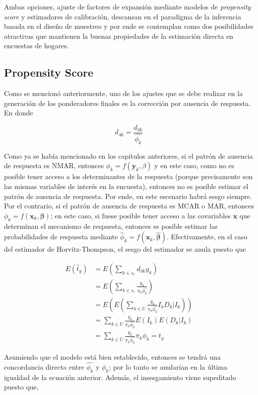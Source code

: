 \documentclass[
  12pt,
]{book}
\begin{document}
Ambas opciones, ajuste de factores de expansión mediante modelos de \emph{propensity score} y estimadores de calibración, descansan en el paradigma de la inferencia basada en el diseño de muestreo y por ende se contemplan como dos posibilidades atractivas que mantienen la buenas propiedades de la estimación directa en encuestas de hogares.

\hypertarget{propensity-score}{%
\subsection{Propensity Score}\label{propensity-score}}

Como se mencionó anteriormente, uno de los ajustes que se debe realizar en la generación de los ponderadores finales es la corrección por ausencia de respuesta. En donde

\[d_{4k} =  \frac{d_{3k}}{\hat{\phi_k}}\]

Como ya se había mencionado en los capítulos anteriores, si el patrón de ausencia de respuesta es NMAR, entonces \(\phi_k = f(\mathbf{y}_k, \beta)\) y en este caso, como no es posible tener acceso a los determinantes de la respuesta (porque precisamente son las mismas variables de interés en la encuesta), entonces no es posible estimar el patrón de ausencia de respuesta. Por ende, en este escenario habrá sesgo siempre. Por el contrario, si el patrón de ausencia de respuesta es MCAR o MAR, entonces \(\phi_k = f(\mathbf{x}_k, \boldsymbol{\beta})\); en este caso, si fuese posible tener acceso a las covariables \(\mathbf{x}\) que determinan el mecanismo de respuesta, entonces es posible estimar las probabilidades de respuesta mediante \(\hat{\phi}_k = f(\mathbf{x}_k, \hat{\boldsymbol{\beta}})\). Efectivamente, en el caso del estimador de Horvitz-Thompson, el sesgo del estimador se anula puesto que

\begin{align*}
E(\hat{t}_y) &= E\left(\sum_{k\in s_r}d_{3k}y_k\right) \\
&= E\left(\sum_{k\in s_r}\frac{y_k}{\pi_k \hat{\phi_k}}\right)\\
&= E\left(E\left(\sum_{k\in U}\frac{y_k}{\pi_k \hat{\phi_k}}I_kD_k|I_k\right)\right)\\
&= \sum_{k\in U}\frac{y_k}{\pi_k \hat{\phi_k}}E\left(I_k\right)E\left(D_k|I_k\right)\\
&= \sum_{k\in U}\frac{y_k}{\pi_k \hat{\phi_k}}\pi_k\phi_k = t_y
\end{align*}

Asumiendo que el modelo está bien establecido, entonces se tendrá una concordancia directa entre \(\hat{\phi_k}\) y \(\phi_k\); por lo tanto se anularían en la última igualdad de la ecuación anterior. Además, el insesgamiento viene supeditado puesto que,
\end{document}
